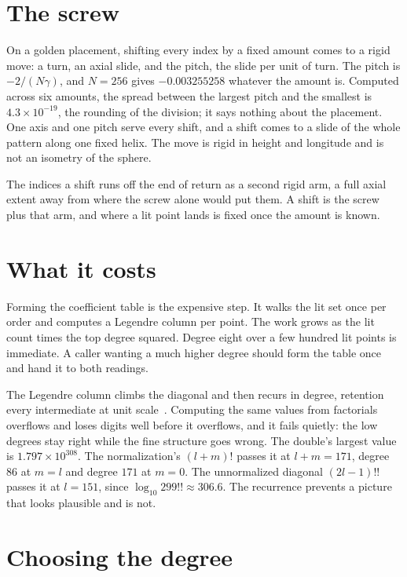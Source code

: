 \section{The screw}

On a golden placement, shifting every index by a fixed amount comes to a rigid move: a turn, an axial slide, and the pitch, the slide per unit of turn. The pitch is \(-2/(N\gamma)\), and \(N = 256\) gives \(-0.003255258\) whatever the amount is. Computed across six amounts, the spread between the largest pitch and the smallest is \(4.3 \times 10^{-19}\), the rounding of the division; it says nothing about the placement. One axis and one pitch serve every shift, and a shift comes to a slide of the whole pattern along one fixed helix. The move is rigid in height and longitude and is not an isometry of the sphere.

The indices a shift runs off the end of return as a second rigid arm, a full axial extent away from where the screw alone would put them. A shift is the screw plus that arm, and where a lit point lands is fixed once the amount is known.

\section{What it costs}

Forming the coefficient table is the expensive step. It walks the lit set once per order and computes a Legendre column per point. The work grows as the lit count times the top degree squared. Degree eight over a few hundred lit points is immediate. A caller wanting a much higher degree should form the table once and hand it to both readings.

The Legendre column climbs the diagonal and then recurs in degree, retention every intermediate at unit scale~\cite{src:Holmes-and-Featherstone-2002}. Computing the same values from factorials overflows and loses digits well before it overflows, and it fails quietly: the low degrees stay right while the fine structure goes wrong. The double's largest value is \(1.797 \times 10^{308}\). The normalization's \((l+m)!\) passes it at \(l + m = 171\), degree \(86\) at \(m = l\) and degree \(171\) at \(m = 0\). The unnormalized diagonal \((2l-1)!!\) passes it at \(l = 151\), since \(\log_{10} 299!! \approx 306.6\). The recurrence prevents a picture that looks plausible and is not.

\section{Choosing the degree}

